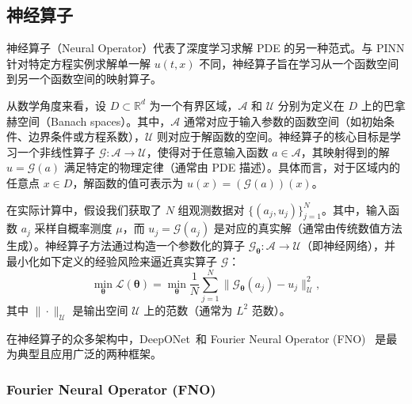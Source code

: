 \subsection{神经算子}
\label{sec:neural-operator}
神经算子（Neural Operator）代表了深度学习求解 PDE 的另一种范式。与 PINN 针对特定方程实例求解单一解 $u(t,x)$ 不同，神经算子旨在学习从一个函数空间到另一个函数空间的映射算子。

从数学角度来看，设 $D \subset \mathbb{R}^d$ 为一个有界区域，$\mathcal{A}$ 和 $\mathcal{U}$ 分别为定义在 $D$ 上的巴拿赫空间（Banach spaces）。其中，$\mathcal{A}$ 通常对应于输入参数的函数空间（如初始条件、边界条件或方程系数），$\mathcal{U}$ 则对应于解函数的空间。神经算子的核心目标是学习一个非线性算子 $\mathcal{G}: \mathcal{A} \to \mathcal{U}$，使得对于任意输入函数 $a \in \mathcal{A}$，其映射得到的解 $u = \mathcal{G}(a)$ 满足特定的物理定律（通常由 PDE 描述）。具体而言，对于区域内的任意点 $x \in D$，解函数的值可表示为 $u(x) = (\mathcal{G}(a))(x)$。

在实际计算中，假设我们获取了 $N$ 组观测数据对 $\{ (a_j, u_j) \}_{j=1}^N$。其中，输入函数 $a_j$ 采样自概率测度 $\mu$，而 $u_j = \mathcal{G}(a_j)$ 是对应的真实解（通常由传统数值方法生成）。神经算子方法通过构造一个参数化的算子 $\mathcal{G}_{\bm{\theta}}: \mathcal{A} \to \mathcal{U}$（即神经网络），并最小化如下定义的经验风险来逼近真实算子 $\mathcal{G}$：
\begin{equation}
    \min_{\bm{\theta}} \mathcal{L}(\bm{\theta}) = \min_{\bm{\theta}} \frac{1}{N} \sum_{j=1}^N \| \mathcal{G}_{\bm{\theta}}(a_j) - u_j \|_{\mathcal{U}}^2,
\end{equation}
其中 $\| \cdot \|_{\mathcal{U}}$ 是输出空间 $\mathcal{U}$ 上的范数（通常为 $L^2$ 范数）。


在神经算子的众多架构中，DeepONet~\cite{lu2021learning,jin2022mionet,wang2021learning,lu2022multifidelity,zhu2023reliable}和 Fourier Neural Operator (FNO) ~\cite{zhang2025ap,chen2021solving}是最为典型且应用广泛的两种框架。

\subsubsection{Fourier Neural Operator (FNO)}

